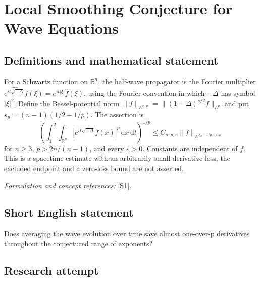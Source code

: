 \documentclass[11pt]{article}
\newcommand{\R}{\mathbb{R}}
\newcommand{\eps}{\varepsilon}
\newcommand{\dd}{\,\mathrm d}
\newcommand{\sref}[2]{\hyperlink{source:#1:#2}{[S#2]}}
\newif\ifshowcatalogue
\newcommand{\cataloguescope}[1]{\ifshowcatalogue
	\paragraph{Exact scope in the supplied catalogue.}
	\begin{quote}\small #1\end{quote}\fi}
\begin{document}
\setcounter{section}{200}
	\clearpage
	\section{\texorpdfstring{Local Smoothing Conjecture for Wave Equations}{Local Smoothing Conjecture for Wave Equations}}\label{201}
	\subsection{Definitions and mathematical statement}
	For a Schwartz function on $\R^n$, the half-wave propagator is the Fourier multiplier
	$\widehat{e^{it\sqrt{-\Delta}}f}(\xi)=e^{it|\xi|}\widehat f(\xi)$, using the Fourier convention in which $-\Delta$ has symbol $|\xi|^2$. Define the Bessel-potential norm
	$\|f\|_{W^{s,p}}=\|(1-\Delta)^{s/2}f\|_{L^p}$ and put $s_p=(n-1)(1/2-1/p)$. The assertion is
	\[
	\left(\int_1^2\int_{\R^n}|e^{it\sqrt{-\Delta}}f(x)|^p\dd x\dd t\right)^{1/p}
	\le C_{n,p,\eps}\|f\|_{W^{s_p-1/p+\eps,p}}
	\]
	for $n\ge3$, $p>2n/(n-1)$, and every $\eps>0$. Constants are independent of $f$. This is a spacetime estimate with an arbitrarily small derivative loss; the excluded endpoint and a zero-loss bound are not asserted.
	\par\smallskip\textit{Formulation and concept references:} \sref{201}{1}.
	\cataloguescope{For every n >= 3, p > 2n/(n-1), and epsilon > 0, prove ||exp(it sqrt(-Delta))f||\_\{L\textasciicircum{}p(R\textasciicircum{}n x [1,2])\} <= C\_\{p,epsilon\} ||f||\_\{W\textasciicircum{}\{s\_p-1/p+epsilon,p\}(R\textasciicircum{}n)\}, where s\_p=(n-1)(1/2-1/p).}
	\subsection{Short English statement}
	Does averaging the wave evolution over time save almost one-over-p derivatives throughout the conjectured range of exponents?
	\subsection{Research attempt}
	
\end{document}
